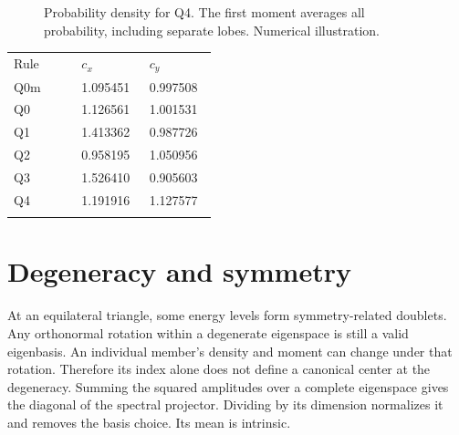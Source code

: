 \documentclass[11pt,oneside,openany]{book}
\newcommand{\toprule}{\hline\noalign{\vskip4pt}}
\newcommand{\midrule}{\noalign{\vskip3pt}\hline\noalign{\vskip4pt}}
\newcommand{\bottomrule}{\noalign{\vskip3pt}\hline}
\begin{document}
\begin{figure}[htbp]
\caption[Probability density for Q4]{Probability density for Q4. The first moment averages all probability, including separate lobes. Numerical illustration.}\label{fig:state-Q4}
\end{figure}
\begin{center}\small\begin{tabular}{p{0.3\linewidth}p{0.3\linewidth}p{0.3\linewidth}}\toprule
Rule & $c_x$ & $c_y$\\\midrule
$\mathrm{Q0m}$ & 1.095451 & 0.997508\\
$\mathrm{Q0}$ & 1.126561 & 1.001531\\
Q1 & 1.413362 & 0.987726\\
Q2 & 0.958195 & 1.050956\\
Q3 & 1.526410 & 0.905603\\
Q4 & 1.191916 & 1.127577\\\bottomrule\end{tabular}\end{center}

\section{Degeneracy and symmetry}\label{sec:slide51}

At an equilateral triangle, some energy levels form symmetry-related doublets. Any orthonormal rotation within a degenerate eigenspace is still a valid eigenbasis. An individual member's density and moment can change under that rotation. Therefore its index alone does not define a canonical center at the degeneracy. Summing the squared amplitudes over a complete eigenspace gives the diagonal of the spectral projector. Dividing by its dimension normalizes it and removes the basis choice. Its mean is intrinsic.
\end{document}
